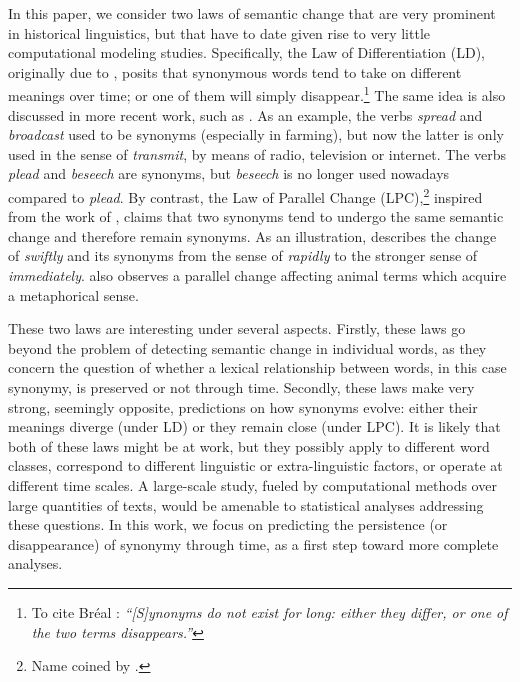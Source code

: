 \documentclass[11pt]{article}
\begin{document}
In this paper, we consider two laws of semantic change that are very prominent in historical linguistics, but that have to date given rise to very little computational modeling studies. Specifically, the Law of Differentiation (LD), originally due to \citet[chapter~2]{breal-1897-essai}, posits that
synonymous words tend to take on different meanings over time; or one of them will simply disappear.\footnote{To cite Bréal : \textit{``[S]ynonyms do not exist for long: either they differ, or one of the two terms disappears.''}} The same idea is also discussed in more recent work, such as \citet{clark_1993}. As an example, the verbs \textit{spread} and \textit{broadcast} used to be synonyms (especially in farming), but now the latter is only used in the sense of \textit{transmit}, by means of radio, television or internet. The verbs \textit{plead} and \textit{beseech} are synonyms, but \textit{beseech} is no longer used nowadays compared to \textit{plead}. By contrast, the Law of
Parallel Change (LPC),\footnote{Name coined by \citet{xu-kemp-2015-evaluation}.} inspired from the work of \citet{stern-1921-swift}, claims that two synonyms tend to undergo the
same semantic change and therefore remain synonyms. As an illustration, \citet[chapter~3 and 4]{stern-1921-swift} describes the change of \textit{swiftly} and its synonyms from the sense of \textit{rapidly} to the stronger sense of \textit{immediately}. \citet{Lehrer-1985-influence} also observes a parallel change affecting animal terms which acquire a metaphorical sense.

These two laws are interesting under several aspects. Firstly, these laws go beyond the problem of detecting semantic change in individual words, as they concern the question of whether a lexical relationship between words, in this case synonymy, is preserved or not through time. Secondly, these laws make very strong, seemingly opposite, predictions on how synonyms evolve: either their meanings diverge (under LD) or they remain close (under LPC). It is likely that both of these laws might be at work, but they possibly apply to different word classes, correspond to different linguistic or extra-linguistic factors, or operate at different time scales. 
A large-scale study, fueled by computational methods over large quantities of texts, would be amenable to statistical analyses addressing these questions. In this work, we focus on predicting the persistence (or disappearance) of synonymy through time, as a first step toward more complete analyses.
\end{document}

